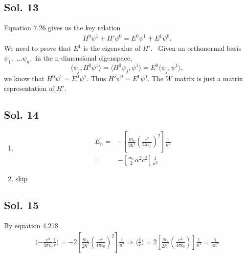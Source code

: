 \subsection*{Sol. 13}
Equation 7.26 gives us the key relation 
\begin{align*}
    H^0\psi^1 + H'\psi^0 = E^0\psi^1 + E^1\psi^0.
\end{align*}
We need to prove that $E^1$ is the eigenvalue of $H'.$ \
Given an orthonormal basis $\psi_1,$ $\dots \psi_n,$ in the n-dimensional eigenspace,
$$
\langle \psi_j, H^0\psi^1\rangle = 
\langle H^0\psi_j, \psi^1\rangle = E^0\langle \psi_j,\psi^1\rangle,
$$
we know that $H^0\psi^1=E^0\psi^1.$ Thus $ H'\psi^0 =  E^1\psi^0.$ The $W$ matrix is just a matrix representation of $H'.$

\subsection*{Sol. 14}
\begin{enumerate}
    \item 
    \begin{align*}
        E_n =& -\left[
        \frac{m_e}{2\hbar^2}
        \left(\frac{e^2}{4\pi\epsilon_0}\right)^2
        \right]\frac{1}{n^2}\\
        =&-\left[
        \frac{m_e}{2}
        \alpha^2 c^2
        \right]\frac{1}{n^2}
    \end{align*}
    \item skip
\end{enumerate}

\subsection*{Sol. 15}
By equation 4.218
\begin{align*}
    \langle -\frac{e^2}{4\pi\epsilon_0}\frac{1}{r}\rangle
    =-2\left[
        \frac{m_e}{2\hbar^2}
        \left(\frac{e^2}{4\pi\epsilon_0}\right)^2
        \right]\frac{1}{n^2}\Rightarrow
        \langle\frac{1}{r}\rangle = 
        2\left[
        \frac{m_e}{2\hbar^2}
        \left(\frac{e^2}{4\pi\epsilon_0}\right)
        \right]\frac{1}{n^2}=\frac{1}{an^2}
\end{align*}


